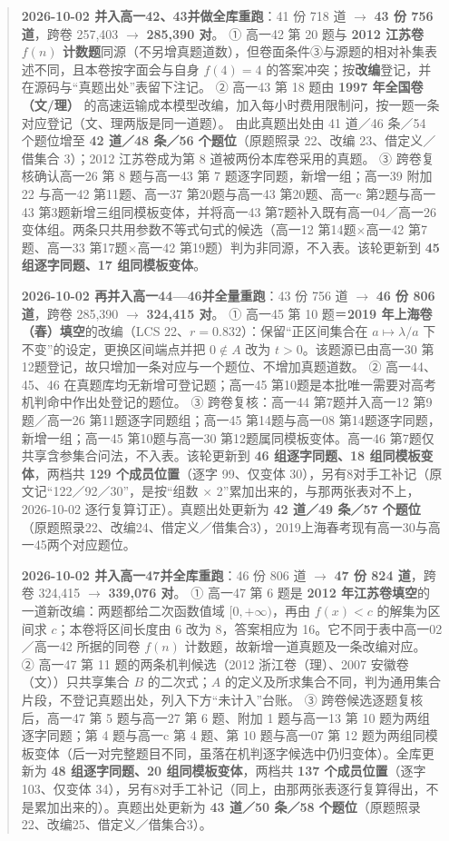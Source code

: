 \documentclass[a4paper,11pt]{article}
\begin{document}
\begin{quote}
\textbf{2026-10-02 并入高一42、43并做全库重跑}：41 份 718 道 $\to$ \textbf{43 份 756 道}，跨卷 257,403 $\to$ \textbf{285,390 对}。
① 高一42 第 20 题与 \textbf{2012 江苏卷 \(f(n)\) 计数题}同源（不另增真题道数），但卷面条件③与源题的相对补集表述不同，且本卷按字面会与自身 \(f(4)=4\) 的答案冲突；按\textbf{改编}登记，并在源码与``真题出处''表留下注记。
② 高一43 第 18 题由 \textbf{1997 年全国卷（文/理）} 的高速运输成本模型改编，加入每小时费用限制问，按一题一条对应登记（文、理两版是同一道题）。
由此真题出处由 41 道／46 条／54 个题位增至 \textbf{42 道／48 条／56 个题位}（原题照录 22、改编 23、借定义／借集合 3）；2012 江苏卷成为第 8 道被两份本库卷采用的真题。
③ 跨卷复核确认高一26 第 8 题与高一43 第 7 题逐字同题，新增一组；高一39 附加22 与高一42 第11题、高一37 第20题与高一43 第20题、高一c 第2题与高一43 第3题新增三组同模板变体，并将高一43 第7题补入既有高一04／高一26 变体组。两条只共用参数不等式句式的候选（高一12 第14题$\times$高一42 第7题、高一33 第17题$\times$高一42 第19题）判为非同源，不入表。该轮更新到 \textbf{45 组逐字同题、17 组同模板变体}。

\textbf{2026-10-02 再并入高一44---46并全量重跑}：43 份 756 道 $\to$ \textbf{46 份 806 道}，跨卷 285,390 $\to$ \textbf{324,415 对}。
① 高一45 第 10 题＝\textbf{2019 年上海卷（春）填空}的改编（LCS 22、\(r=0.832\)）：保留``正区间集合在 \(a\mapsto\lambda/a\) 下不变''的设定，更换区间端点并把 \(0\notin A\) 改为 \(t>0\)。该题源已由高一30 第12题登记，故只增加一条对应与一个题位、不增加真题道数。
② 高一44、45、46 在真题库均无新增可登记题；高一45 第10题是本批唯一需要对高考机判命中作出处登记的题位。
③ 跨卷复核：高一44 第7题并入高一12 第9题／高一26 第11题逐字同题组；高一45 第14题与高一08 第14题逐字同题，新增一组；高一45 第10题与高一30 第12题属同模板变体。高一46 第7题仅共享含参集合问法，不入表。该轮更新到 \textbf{46 组逐字同题、18 组同模板变体}，两档共 \textbf{129 个成员位置}（逐字 99、仅变体 30），另有8对手工补记（原文记``122／92／30''，是按``组数 $\times$ 2''累加出来的，与那两张表对不上，2026-10-02 逐行复算订正）。真题出处更新为 \textbf{42 道／49 条／57 个题位}（原题照录22、改编24、借定义／借集合3），2019上海春考现有高一30与高一45两个对应题位。

\textbf{2026-10-02 并入高一47并全库重跑}：46 份 806 道 $\to$ \textbf{47 份 824 道}，跨卷 324,415 $\to$ \textbf{339,076 对}。
① 高一47 第 6 题是 \textbf{2012 年江苏卷填空}的一道新改编：两题都给二次函数值域 \([0,+\infty)\)，再由 \(f(x)<c\) 的解集为区间求 \(c\)；本卷将区间长度由 6 改为 8，答案相应为 16。它不同于表中高一02／高一42 所据的同卷 \(f(n)\) 计数题，故新增一道真题及一条改编对应。
② 高一47 第 11 题的两条机判候选（2012 浙江卷（理）、2007 安徽卷（文））只共享集合 \(B\) 的二次式；\(A\) 的定义及所求集合不同，判为通用集合片段，不登记真题出处，列入下方``未计入''台账。
③ 跨卷候选逐题复核后，高一47 第 5 题与高一27 第 6 题、附加 1 题与高一13 第 10 题为两组逐字同题；第 4 题与高一c 第 4 题、第 10 题与高一07 第 12 题为两组同模板变体（后一对完整题目不同，虽落在机判逐字候选中仍归变体）。全库更新为 \textbf{48 组逐字同题、20 组同模板变体}，两档共 \textbf{137 个成员位置}（逐字 103、仅变体 34），另有8对手工补记（同上，由那两张表逐行复算得出，不是累加出来的）。真题出处更新为 \textbf{43 道／50 条／58 个题位}（原题照录22、改编25、借定义／借集合3）。


\end{quote}
\end{document}

